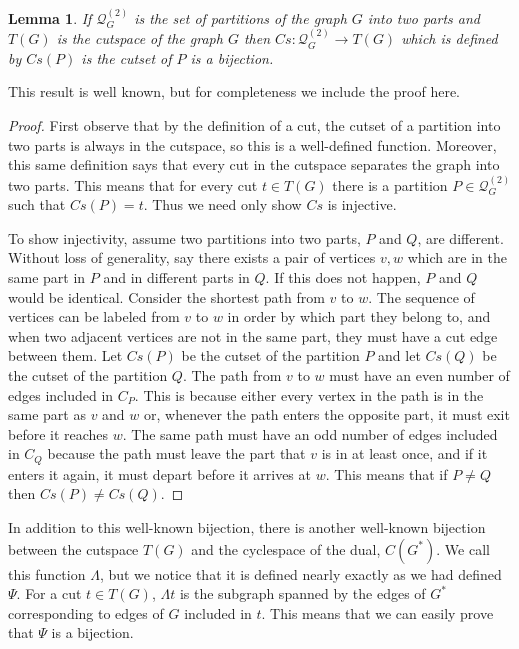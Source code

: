 \documentclass{article}
\newtheorem{lemma}{Lemma}[section]
\begin{document}
    \begin{lemma}\label{lem:uniqueCutset}
        If $\mathcal{Q}_G^{(2)}$ is the set of partitions of the graph $G$ into two parts and $T(G)$ is the cutspace of the graph $G$ then $Cs:\mathcal{Q}_G^{(2)}\to T(G)$ which is defined by $Cs(P)$ is the cutset of $P$ is a bijection.
    \end{lemma}
    This result is well known, but for completeness we include the proof here. 
    \begin{proof}
        First observe that by the definition of a cut, the cutset of a partition into two parts is always in the cutspace, so this is a well-defined function. Moreover, this same definition says that every cut in the cutspace separates the graph into two parts. This means that for every cut  $t\in T(G)$ there is a partition $P\in \mathcal{Q}_G^{(2)}$ such that $Cs(P)=t$. Thus we need only show $Cs$ is injective. 
            
        To show injectivity, assume two partitions into two parts, $P$ and $Q$, are different. Without loss of generality, say there exists a pair of vertices $v,w$ which are in the same part in $P$ and in different parts in $Q$. If this does not happen, $P$ and $Q$ would be identical. Consider the shortest path from $v$ to $w$. The sequence of vertices can be labeled from $v$ to $w$ in order by which part they belong to, and when two adjacent vertices are not in the same part, they must have a cut edge between them. Let $Cs(P)$ be the cutset of the partition $P$ and let $Cs(Q)$ be the cutset of the partition $Q$. The path from $v$ to $w$ must have an even number of edges included in $C_P$. This is because either every vertex in the path is in the same part as $v$ and $w$ or, whenever the path enters the opposite part, it must exit before it reaches $w$. The same path must have an odd number of edges included in $C_Q$ because the path must leave the part that $v$ is in at least once, and if it enters it again, it must depart before it arrives at $w$.  This means that if $P\neq Q$ then $Cs(P)\neq Cs(Q)$.
    \end{proof}

    In addition to this well-known bijection, there is another well-known bijection between the cutspace $T(G)$ and the cyclespace of the dual, $C(G^*)$\cite{NishizekiPlanarGraphs}. We call this function $\Lambda$, but we notice that it is defined nearly exactly as we had defined $\Psi$. For a cut $t\in T(G)$, $\Lambda t$ is the subgraph spanned by the edges of $G^*$ corresponding to edges of $G$ included in $t$. This means that we can easily prove that $\Psi$ is a bijection.
    
\end{document}
